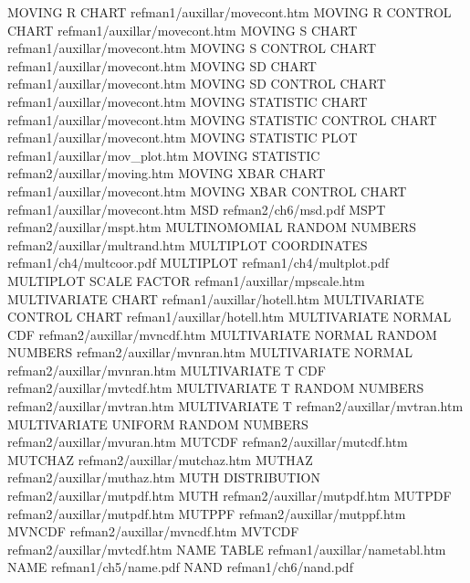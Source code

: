 MOVING R CHART                          refman1/auxillar/movecont.htm
MOVING R CONTROL CHART                  refman1/auxillar/movecont.htm
MOVING S CHART                          refman1/auxillar/movecont.htm
MOVING S CONTROL CHART                  refman1/auxillar/movecont.htm
MOVING SD CHART                         refman1/auxillar/movecont.htm
MOVING SD CONTROL CHART                 refman1/auxillar/movecont.htm
MOVING STATISTIC CHART                  refman1/auxillar/movecont.htm
MOVING STATISTIC CONTROL CHART          refman1/auxillar/movecont.htm
MOVING STATISTIC PLOT                   refman1/auxillar/mov_plot.htm
MOVING STATISTIC                        refman2/auxillar/moving.htm
MOVING XBAR CHART                       refman1/auxillar/movecont.htm
MOVING XBAR CONTROL CHART               refman1/auxillar/movecont.htm
MSD                                     refman2/ch6/msd.pdf
MSPT                                    refman2/auxillar/mspt.htm
MULTINOMOMIAL RANDOM NUMBERS            refman2/auxillar/multrand.htm
MULTIPLOT COORDINATES                   refman1/ch4/multcoor.pdf
MULTIPLOT                               refman1/ch4/multplot.pdf
MULTIPLOT SCALE FACTOR                  refman1/auxillar/mpscale.htm
MULTIVARIATE CHART                      refman1/auxillar/hotell.htm
MULTIVARIATE CONTROL CHART              refman1/auxillar/hotell.htm
MULTIVARIATE NORMAL CDF                 refman2/auxillar/mvncdf.htm
MULTIVARIATE NORMAL RANDOM NUMBERS      refman2/auxillar/mvnran.htm
MULTIVARIATE NORMAL                     refman2/auxillar/mvnran.htm
MULTIVARIATE T CDF                      refman2/auxillar/mvtcdf.htm
MULTIVARIATE T RANDOM NUMBERS           refman2/auxillar/mvtran.htm
MULTIVARIATE T                          refman2/auxillar/mvtran.htm
MULTIVARIATE UNIFORM RANDOM NUMBERS     refman2/auxillar/mvuran.htm
MUTCDF                                  refman2/auxillar/mutcdf.htm
MUTCHAZ                                 refman2/auxillar/mutchaz.htm
MUTHAZ                                  refman2/auxillar/muthaz.htm
MUTH DISTRIBUTION                       refman2/auxillar/mutpdf.htm
MUTH                                    refman2/auxillar/mutpdf.htm
MUTPDF                                  refman2/auxillar/mutpdf.htm
MUTPPF                                  refman2/auxillar/mutppf.htm
MVNCDF                                  refman2/auxillar/mvncdf.htm
MVTCDF                                  refman2/auxillar/mvtcdf.htm
NAME TABLE                              refman1/auxillar/nametabl.htm
NAME                                    refman1/ch5/name.pdf
NAND                                    refman1/ch6/nand.pdf
